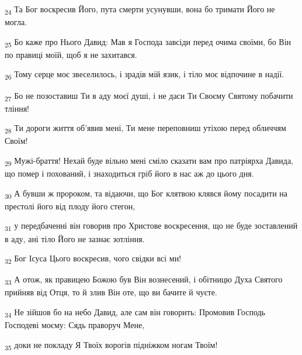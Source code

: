 \begin{tcolorbox}
\textsubscript{24} Та Бог воскресив Його, пута смерти усунувши, вона бо тримати Його не могла.
\end{tcolorbox}
\begin{tcolorbox}
\textsubscript{25} Бо каже про Нього Давид: Мав я Господа завсіди перед очима своїми, бо Він по правиці моїй, щоб я не захитався.
\end{tcolorbox}
\begin{tcolorbox}
\textsubscript{26} Тому серце моє звеселилось, і зрадів мій язик, і тіло моє відпочине в надії.
\end{tcolorbox}
\begin{tcolorbox}
\textsubscript{27} Бо не позоставиш Ти в аду моєї душі, і не даси Ти Своєму Святому побачити тління!
\end{tcolorbox}
\begin{tcolorbox}
\textsubscript{28} Ти дороги життя об'явив мені, Ти мене переповниш утіхою перед обличчям Своїм!
\end{tcolorbox}
\begin{tcolorbox}
\textsubscript{29} Мужі-браття! Нехай буде вільно мені сміло сказати вам про патріярха Давида, що помер і похований, і знаходиться гріб його в нас аж до цього дня.
\end{tcolorbox}
\begin{tcolorbox}
\textsubscript{30} А бувши ж пророком, та відаючи, що Бог клятвою клявся йому посадити на престолі його від плоду його стегон,
\end{tcolorbox}
\begin{tcolorbox}
\textsubscript{31} у передбаченні він говорив про Христове воскресення, що не буде зоставлений в аду, ані тіло Його не зазнає зотління.
\end{tcolorbox}
\begin{tcolorbox}
\textsubscript{32} Бог Ісуса Цього воскресив, чого свідки всі ми!
\end{tcolorbox}
\begin{tcolorbox}
\textsubscript{33} А отож, як правицею Божою був Він вознесений, і обітницю Духа Святого прийняв від Отця, то й злив Він оте, що ви бачите й чуєте.
\end{tcolorbox}
\begin{tcolorbox}
\textsubscript{34} Не зійшов бо на небо Давид, але сам він говорить: Промовив Господь Господеві моєму: Сядь праворуч Мене,
\end{tcolorbox}
\begin{tcolorbox}
\textsubscript{35} доки не покладу Я Твоїх ворогів підніжком ногам Твоїм!
\end{tcolorbox}
